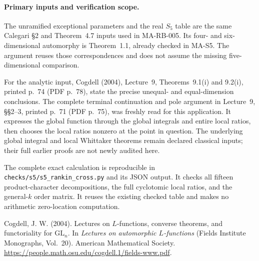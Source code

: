 \paragraph{Primary inputs and verification scope.}
The unramified exceptional parameters and the real
\(S_5\) table are the same Calegari \S2 and
Theorem~4.7 inputs used in MA-RB-005. Its four- and
six-dimensional automorphy is Theorem~1.1, already
checked in MA-S5. The argument reuses those
correspondences and does not assume the missing
five-dimensional comparison.

For the analytic input, Cogdell (2004), Lecture~9,
Theorems~9.1(i) and 9.2(i), printed p.~74
(PDF p.~78), state the precise unequal- and
equal-dimension conclusions. The complete terminal
continuation and pole argument in Lecture~9,
\S\S2--3, printed p.~71 (PDF p.~75), was freshly
read for this application. It expresses the global
function through the global integrals and entire
local ratios, then chooses the local ratios nonzero
at the point in question. The underlying global
integral and local Whittaker theorems remain declared
classical inputs; their full earlier proofs are not
newly audited here.

The complete exact calculation is reproducible in
\texttt{checks/s5/s5\_rankin\_cross.py} and its JSON
output. It checks all fifteen product-character
decompositions, the full cyclotomic local ratios,
and the general-\(k\) order matrix. It reuses the
existing checked table and makes no arithmetic
zero-location computation.

Cogdell, J. W. (2004). Lectures on \(L\)-functions,
converse theorems, and functoriality for
\(\mathrm{GL}_n\). In \emph{Lectures on automorphic
\(L\)-functions} (Fields Institute Monographs,
Vol.~20). American Mathematical Society.
\url{https://people.math.osu.edu/cogdell.1/fields-www.pdf}.
